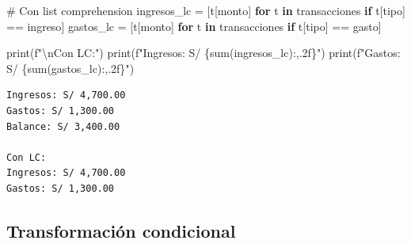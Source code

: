 \documentclass[
  doc,
  floatsintext,
  longtable,
  a4paper,
  nolmodern,
  notxfonts,
  notimes,
  12pt,
  colorlinks=true,linkcolor=blue,citecolor=blue,urlcolor=blue]{apa7}
\newenvironment{Shaded}{\begin{snugshade}}{\end{snugshade}}
\newcommand{\BuiltInTok}[1]{\textcolor[rgb]{0.00,0.23,0.31}{#1}}
\newcommand{\CharTok}[1]{\textcolor[rgb]{0.13,0.47,0.30}{#1}}
\newcommand{\CommentTok}[1]{\textcolor[rgb]{0.37,0.37,0.37}{#1}}
\newcommand{\ControlFlowTok}[1]{\textcolor[rgb]{0.00,0.23,0.31}{\textbf{#1}}}
\newcommand{\KeywordTok}[1]{\textcolor[rgb]{0.00,0.23,0.31}{\textbf{#1}}}
\newcommand{\NormalTok}[1]{\textcolor[rgb]{0.00,0.23,0.31}{#1}}
\newcommand{\OperatorTok}[1]{\textcolor[rgb]{0.37,0.37,0.37}{#1}}
\newcommand{\SpecialCharTok}[1]{\textcolor[rgb]{0.37,0.37,0.37}{#1}}
\newcommand{\SpecialStringTok}[1]{\textcolor[rgb]{0.13,0.47,0.30}{#1}}
\newcommand{\StringTok}[1]{\textcolor[rgb]{0.13,0.47,0.30}{#1}}
\begin{document}
\begin{Shaded}
\begin{Highlighting}[]
\CommentTok{\# Con list comprehension}
\NormalTok{ingresos\_lc }\OperatorTok{=}\NormalTok{ [t[}\StringTok{\textquotesingle{}monto\textquotesingle{}}\NormalTok{] }\ControlFlowTok{for}\NormalTok{ t }\KeywordTok{in}\NormalTok{ transacciones }\ControlFlowTok{if}\NormalTok{ t[}\StringTok{\textquotesingle{}tipo\textquotesingle{}}\NormalTok{] }\OperatorTok{==} \StringTok{\textquotesingle{}ingreso\textquotesingle{}}\NormalTok{]}
\NormalTok{gastos\_lc }\OperatorTok{=}\NormalTok{ [t[}\StringTok{\textquotesingle{}monto\textquotesingle{}}\NormalTok{] }\ControlFlowTok{for}\NormalTok{ t }\KeywordTok{in}\NormalTok{ transacciones }\ControlFlowTok{if}\NormalTok{ t[}\StringTok{\textquotesingle{}tipo\textquotesingle{}}\NormalTok{] }\OperatorTok{==} \StringTok{\textquotesingle{}gasto\textquotesingle{}}\NormalTok{]}

\BuiltInTok{print}\NormalTok{(}\SpecialStringTok{f"}\CharTok{\textbackslash{}n}\SpecialStringTok{Con LC:"}\NormalTok{)}
\BuiltInTok{print}\NormalTok{(}\SpecialStringTok{f"Ingresos: S/ }\SpecialCharTok{\{}\BuiltInTok{sum}\NormalTok{(ingresos\_lc)}\SpecialCharTok{:,.2f\}}\SpecialStringTok{"}\NormalTok{)}
\BuiltInTok{print}\NormalTok{(}\SpecialStringTok{f"Gastos: S/ }\SpecialCharTok{\{}\BuiltInTok{sum}\NormalTok{(gastos\_lc)}\SpecialCharTok{:,.2f\}}\SpecialStringTok{"}\NormalTok{)}
\end{Highlighting}
\end{Shaded}

\begin{verbatim}
Ingresos: S/ 4,700.00
Gastos: S/ 1,300.00
Balance: S/ 3,400.00

Con LC:
Ingresos: S/ 4,700.00
Gastos: S/ 1,300.00
\end{verbatim}

\subsection{Transformación
condicional}\label{transformaciuxf3n-condicional}
\end{document}
